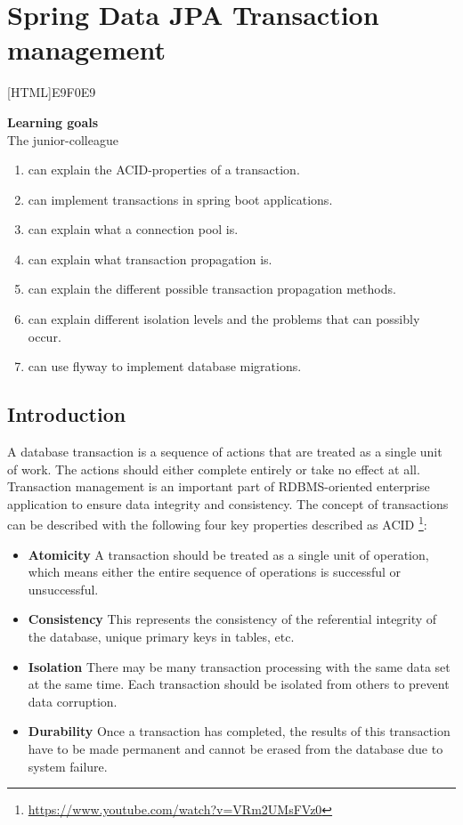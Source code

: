 \chapter{Spring Data JPA Transaction management}

[HTML]{E9F0E9}{\parbox{\textwidth}{%
\noindent \textbf{Learning goals}\\
The junior-colleague
\begin{enumerate}[nolistsep]
\item can explain the ACID-properties of a transaction.
\item can implement transactions in spring boot applications.
\item can explain what a connection pool is.
\item can explain what transaction propagation is.
\item can explain the different possible transaction propagation methods.
\item can explain different isolation levels and the problems that can possibly occur.
\item can use flyway to implement database migrations.
\end{enumerate}}}

\section{Introduction}

A database transaction is a sequence of actions that are treated as a single unit of work. The actions should either complete entirely or take no effect at all. Transaction management is an important part of RDBMS-oriented enterprise application to ensure data integrity and consistency. The concept of transactions can be described with the following four key properties described as ACID \footnote{\url{https://www.youtube.com/watch?v=VRm2UMsFVz0}}:

\begin{itemize}
\item \textbf{Atomicity} A transaction should be treated as a single unit of operation, which means either the entire sequence of operations is successful or unsuccessful.

\item \textbf{Consistency} This represents the consistency of the referential integrity of the database, unique primary keys in tables, etc.

\item \textbf{Isolation} There may be many transaction processing with the same data set at the same time. Each transaction should be isolated from others to prevent data corruption.

\item \textbf{Durability} Once a transaction has completed, the results of this transaction have to be made permanent and cannot be erased from the database due to system failure.
\end{itemize}

